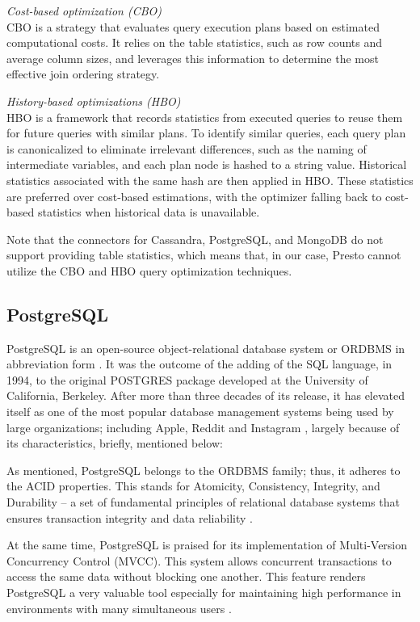 \documentclass[conference]{IEEEtran}
\begin{document}
\textit{Cost-based optimization (CBO)} \\
CBO is a strategy that evaluates query execution plans based on estimated computational costs. It relies on the table statistics, such as row counts and average column sizes, and leverages this information to determine the most effective join ordering strategy.\cite{b4}

\textit{History-based optimizations (HBO)} \\
HBO is a framework that records statistics from executed queries to reuse them for future queries with similar plans. To identify similar queries, each query plan is canonicalized to eliminate irrelevant differences, such as the naming of intermediate variables, and each plan node is hashed to a string value. Historical statistics associated with the same hash are then applied in HBO. These statistics are preferred over cost-based estimations, with the optimizer falling back to cost-based statistics when historical data is unavailable.\cite{b2}

Note that the connectors for Cassandra, PostgreSQL, and MongoDB do not support providing table statistics, which means that, in our case, Presto cannot utilize the CBO and HBO query optimization techniques.

\subsection{PostgreSQL}

PostgreSQL is an open-source object-relational database system or ORDBMS in abbreviation form \cite{b5}. It was the outcome of the adding of the SQL language, in 1994, to the original POSTGRES package developed at the University of California, Berkeley. After more than three decades of its release, it has elevated itself as one of the most popular database management systems being used by large organizations; including Apple, Reddit and Instagram \cite{b6}, largely because of its characteristics, briefly, mentioned below:

As mentioned, PostgreSQL belongs to the ORDBMS family; thus, it adheres to the ACID properties. This stands for Atomicity, Consistency, Integrity, and Durability – a set of fundamental principles of relational database systems that ensures transaction integrity and data reliability \cite{b7, b8}.

At the same time, PostgreSQL is praised for its implementation of Multi-Version Concurrency Control (MVCC). This system allows concurrent transactions to access the same data without blocking one another. This feature renders PostgreSQL a very valuable tool especially for maintaining high performance in environments with many simultaneous users \cite{b6}.
\end{document}
